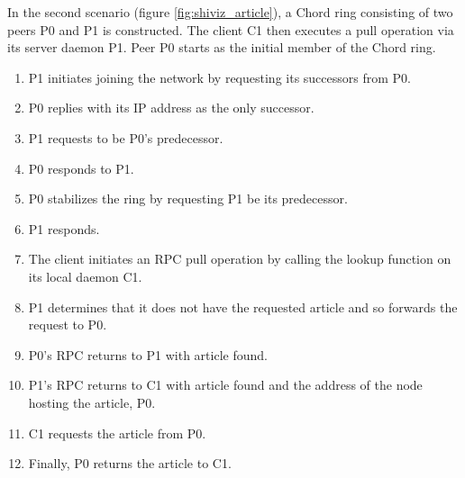 \documentclass[twocolumn]{article}
\begin{document}
In the second scenario (figure \ref{fig:shiviz_article}), a Chord ring consisting of two peers P0 and P1 is constructed. The client C1 then executes a pull operation via its server daemon P1. Peer P0 starts as the initial member of the Chord ring.
\begin{enumerate}
  \item P1 initiates joining the network by requesting its successors from P0.
  \item P0 replies with its IP address as the only successor.
  \item P1 requests to be P0's predecessor.
  \item P0 responds to P1.
  \item P0 stabilizes the ring by requesting P1 be its predecessor.
  \item P1 responds.
  \item The client initiates an RPC pull operation by calling the lookup function on its local daemon C1.
  \item P1 determines that it does not have the requested article and so forwards the request to P0.
  \item P0's RPC returns to P1 with article found.
  \item P1's RPC returns to C1 with article found and the address of the node hosting the article, P0.
  \item C1 requests the article from P0.
  \item Finally, P0 returns the article to C1.
\end{enumerate}
\end{document}
